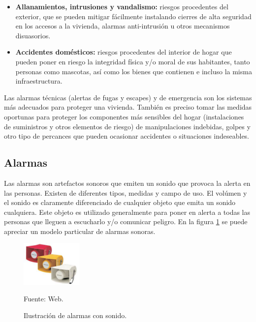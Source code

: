 \begin{itemize}
    \item \textbf{Allanamientos, intrusiones y vandalismo:} riesgos procedentes del exterior, que se pueden mitigar fácilmente instalando cierres de alta seguridad en los accesos a la vivienda, alarmas anti-intrusión u otros mecanismos disuasorios.
    \item \textbf{Accidentes domésticos:} riesgos procedentes del interior de hogar que pueden poner en riesgo la integridad física y/o moral de sus habitantes, tanto personas como mascotas, así como los bienes que contienen e incluso la misma infraestructura.
\end{itemize}

Las alarmas técnicas (alertas de fugas y escapes) y de emergencia son los sistemas más adecuados para proteger una vivienda. También es preciso tomar las medidas oportunas para proteger los componentes más sensibles del hogar (instalaciones de suministros y otros elementos de riesgo) de manipulaciones indebidas, golpes y otro tipo de percances que pueden ocasionar accidentes o situaciones indeseables.\\

\subsection{Alarmas}

Las alarmas son artefactos sonoros que emiten un sonido que provoca la alerta en las personas. Existen de diferentes tipos, medidas y campo de uso. El volúmen y el sonido es claramente diferenciado de cualquier objeto que emita un sonido cualquiera. Este objeto es utilizado generalmente para poner en alerta a todas las personas que lleguen a escucharlo y/o comunicar peligro.
En la figura \ref{fig:bocinas} se puede apreciar un modelo particular de alarmas sonoras.

\begin{figure}[H]
    \begin{center}
        \includegraphics[width=3cm]{img/capitulo_3/alarmas.jpg}
    \end{center}
    \begin{center}
        \caption{Ilustración de alarmas con sonido.}
        Fuente: Web.
        \label{fig:bocinas}
    \end{center}
\end{figure}

